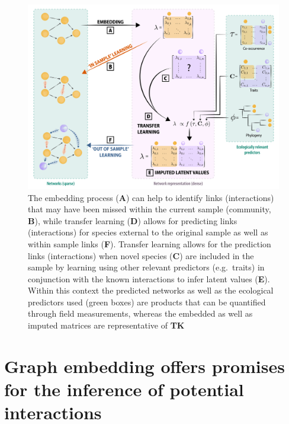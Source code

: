 \documentclass[10pt,oneside]{article}
\makeatletter
\def\maxwidth{\ifdim\Gin@nat@width>\linewidth\linewidth
\else\Gin@nat@width\fi}
\let\Oldincludegraphics\includegraphics
\renewcommand{\includegraphics}[1]{\Oldincludegraphics[width=\maxwidth]{#1}}
\makeatother
\begin{document}
\begin{figure}
\hypertarget{fig:embedding}{%
\centering
\includegraphics{figures/conceptual_2.png}
\caption{The embedding process (\textbf{A}) can help to identify links
(interactions) that may have been missed within the current sample
(community, \textbf{B}), while transfer learning (\textbf{D}) allows for
predicting links (interactions) for species external to the original
sample as well as within sample links (\textbf{F}). Transfer learning
allows for the prediction links (interactions) when novel species
(\textbf{C}) are included in the sample by learning using other relevant
predictors (e.g.~traits) in conjunction with the known interactions to
infer latent values (\textbf{E}). Within this context the predicted
networks as well as the ecological predictors used (green boxes) are
products that can be quantified through field measurements, whereas the
embedded as well as imputed matrices are representative of
\textbf{TK}}\label{fig:embedding}
}
\end{figure}

\hypertarget{graph-embedding-offers-promises-for-the-inference-of-potential-interactions}{%
\section{Graph embedding offers promises for the inference of potential
interactions}\label{graph-embedding-offers-promises-for-the-inference-of-potential-interactions}}
\end{document}
